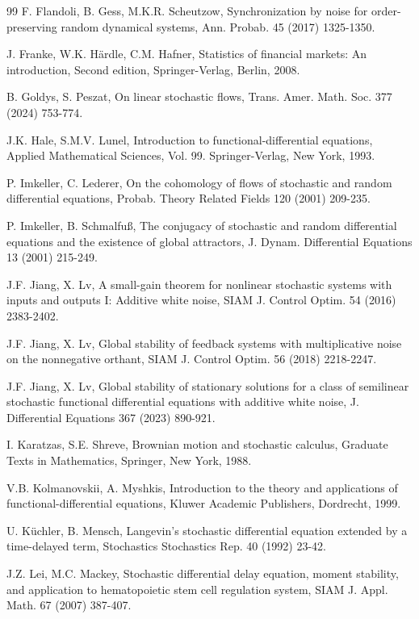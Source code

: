 \documentclass[preprint,12pt]{elsarticle}
\begin{document}
\begin{thebibliography}{99}
 F. Flandoli, B. Gess, M.K.R. Scheutzow, Synchronization by noise for order-preserving random dynamical systems, Ann. Probab. 45 (2017) 1325-1350.

 J. Franke, W.K. H\"{a}rdle, C.M. Hafner, Statistics of financial markets: An introduction, Second edition, Springer-Verlag, Berlin, 2008.

 B. Goldys, S. Peszat, On linear stochastic flows, Trans. Amer. Math. Soc. 377 (2024) 753-774.

 J.K. Hale, S.M.V. Lunel, Introduction to functional-differential equations, Applied Mathematical Sciences, Vol. 99. Springer-Verlag, New York, 1993.

 P. Imkeller, C. Lederer, On the cohomology of flows of stochastic and random differential equations, Probab. Theory Related Fields 120 (2001) 209-235.

  P. Imkeller, B. Schmalfu{\ss}, The conjugacy of stochastic and random differential equations and the existence of global attractors, J. Dynam. Differential Equations 13 (2001) 215-249.

 J.F. Jiang, X. Lv,
A small-gain theorem for nonlinear stochastic systems with inputs and outputs I: Additive white noise, SIAM J. Control Optim. 54 (2016) 2383-2402.

 J.F. Jiang, X. Lv, Global stability of feedback systems with multiplicative
noise on the nonnegative orthant, SIAM J. Control Optim. 56 (2018) 2218-2247.

 J.F. Jiang, X. Lv, Global stability of stationary solutions for a class of semilinear stochastic functional differential equations with additive white noise, J. Differential Equations 367 (2023) 890-921.

 I. Karatzas, S.E. Shreve, Brownian motion and stochastic calculus, Graduate Texts in Mathematics, Springer, New York, 1988.

 V.B. Kolmanovskii, A. Myshkis, Introduction to the theory and applications of functional-differential equations, Kluwer Academic Publishers, Dordrecht, 1999.

 U. K\"{u}chler, B. Mensch, Langevin's stochastic differential equation extended by a time-delayed term, Stochastics Stochastics Rep. 40 (1992)
23-42.

J.Z. Lei, M.C. Mackey, Stochastic differential delay equation, moment stability, and application to hematopoietic stem cell regulation system, SIAM J. Appl. Math. 67 (2007) 387-407.


\end{thebibliography}
\end{document}
